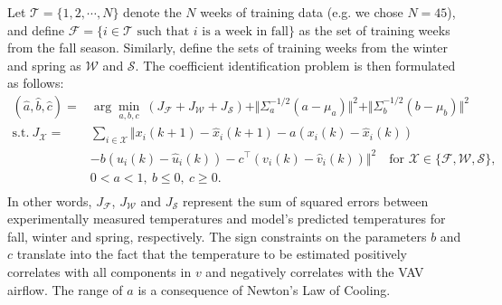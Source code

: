 Let $\mathcal{T} = \{1, 2, \cdots, N\}$ denote the $N$ weeks of training data (e.g. we chose $N = 45$), and define $\mathcal{F} = \{i \in \mathcal{T} \text{ such that $i$ is a week in fall} \}$ as the set of training weeks from the fall season. Similarly, define the sets of training weeks from the winter and spring as $\mathcal{W}$ and $\mathcal{S}$.
The coefficient identification problem is then formulated as follows:
\begin{equation}\label{eq:data_opt}
\begin{aligned}
(\hat{a}, \hat{b} , \hat{c}) = &\arg\min_{a, b, c}~\left(J_\mathcal{F} + J_\mathcal{W} + J_\mathcal{S}\right) + \Vert \Sigma_a^{-1/2} (a - \mu_a) \Vert^2 + \Vert \Sigma_b^{-1/2} (b - \mu_b)  \Vert^2 \\
\text{s.t.}~ J_\mathcal{X}= & \textstyle \sum_{i \in \mathcal{X}} \Vert x_i(k+1) - \hat{x}_i(k+1) - a\left( x_i(k) - \hat{x}_i(k) \right)\\
& - b\left( u_i(k) - \hat{u}_i(k) \right) - {c}^\top\left( v_i(k) - \hat{v}_i(k) \right) \Vert ^ 2 \quad \text{for } \mathcal{X} \in \lbrace \mathcal{F}, \mathcal{W}, \mathcal{S} \rbrace, \\
& 0 < a < 1,~ b \leq 0,~ c \geq 0. \\
\end{aligned}
\end{equation}
In other words, $J_\mathcal{F}$, $J_\mathcal{W}$ and $J_\mathcal{S}$ represent the sum of squared errors between experimentally measured temperatures and model's predicted temperatures for fall, winter and spring, respectively.
The sign constraints on the parameters $b$ and $c$ translate into the fact that the temperature to be estimated positively correlates with all components in $v$ and negatively correlates with the VAV airflow. The range of $a$ is a consequence of Newton's Law of Cooling.

